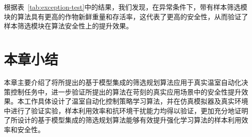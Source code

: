 根据表~\ref{tab:exception-test}中的结果，我们发现，在异常条件下，带有样本筛选模块的算法具有更高的作物新鲜重量和存活率，这代表了更高的安全性，从而验证了样本筛选模块在算法安全性上的提升效果。

\section{本章小结}

本章主要介绍了将所提出的基于模型集成的筛选规划算法应用于真实温室自动化决策控制任务中，进一步验证所提出的算法在苛刻的真实应用场景中的安全性提升效果。本工作具体设计了温室自动化控制策略学习算法，并在仿真模拟器及真实环境中进行了验证实验，样本利用效率和抗环境干扰能力均得以验证，更加充分地证明了所设计的基于模型集成的筛选规划算法能够有效提升强化学习算法的样本利用效率和安全性。